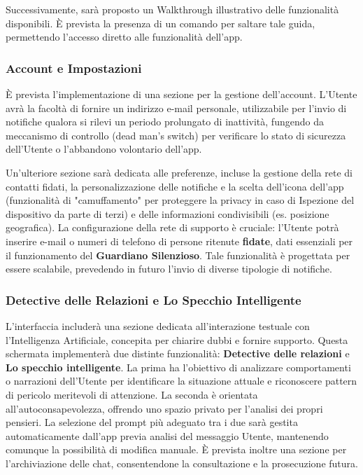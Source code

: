 \documentclass[a4paper,12pt]{article}
\begin{document}
Successivamente, sarà proposto un Walkthrough illustrativo delle funzionalità disponibili. È prevista la presenza di un comando per saltare tale guida, permettendo l'accesso diretto alle funzionalità dell'app.

\subsubsection{Account e Impostazioni}
È prevista l'implementazione di una sezione per la gestione dell'account. L'Utente avrà la facoltà di fornire un indirizzo e-mail personale, utilizzabile per l'invio di notifiche qualora si rilevi un periodo prolungato di inattività, fungendo da meccanismo di controllo (dead man's switch) per verificare lo stato di sicurezza dell'Utente o l'abbandono volontario dell'app.

Un'ulteriore sezione sarà dedicata alle preferenze, incluse la gestione della rete di contatti fidati, la personalizzazione delle notifiche e la scelta dell'icona dell'app (funzionalità di "camuffamento" per proteggere la privacy in caso di Ispezione del dispositivo da parte di terzi) e delle informazioni condivisibili (es. posizione geografica). La configurazione della rete di supporto è cruciale: l'Utente potrà inserire e-mail o numeri di telefono di persone ritenute \textbf{fidate}, dati essenziali per il funzionamento del \textbf{Guardiano Silenzioso}. Tale funzionalità è progettata per essere scalabile, prevedendo in futuro l'invio di diverse tipologie di notifiche.

\subsubsection{Detective delle Relazioni e Lo Specchio Intelligente}
L'interfaccia includerà una sezione dedicata all'interazione testuale con l'Intelligenza Artificiale, concepita per chiarire dubbi e fornire supporto. Questa schermata implementerà due distinte funzionalità: \textbf{Detective delle relazioni} e \textbf{Lo specchio intelligente}.
La prima ha l'obiettivo di analizzare comportamenti o narrazioni dell'Utente per identificare la situazione attuale e riconoscere pattern di pericolo meritevoli di attenzione. La seconda è orientata all'autoconsapevolezza, offrendo uno spazio privato per l'analisi dei propri pensieri.
La selezione del prompt più adeguato tra i due sarà gestita automaticamente dall'app previa analisi del messaggio Utente, mantenendo comunque la possibilità di modifica manuale. È prevista inoltre una sezione per l'archiviazione delle chat, consentendone la consultazione e la prosecuzione futura.
\end{document}

